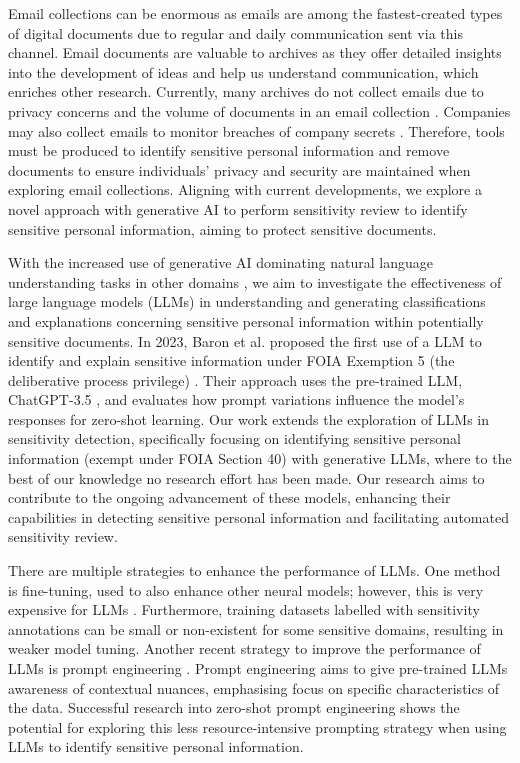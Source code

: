Email collections can be enormous as emails are among the fastest-created types of digital documents due to regular and daily communication sent via this channel. Email documents are valuable to archives as they offer detailed insights into the development of ideas and help us understand communication, which enriches other research. Currently, many archives do not collect emails due to privacy concerns and the volume of documents in an email collection \cite{TFTAEA:18}. Companies may also collect emails to monitor breaches of company secrets \cite{iqbal2021search}. Therefore, tools must be produced to identify sensitive personal information and remove documents to ensure individuals' privacy and security are maintained when exploring email collections. Aligning with current developments, we explore a novel approach with generative AI to perform sensitivity review to identify sensitive personal information, aiming to protect sensitive documents.

With the increased use of generative AI dominating natural language understanding tasks in other domains \cite{qiu2020pre, adiwardana2020towards, roller2020recipes, openai2023gpt}, we aim to investigate the effectiveness of large language models (LLMs) in understanding and generating classifications and explanations concerning sensitive personal information within potentially sensitive documents. In 2023, Baron et al. proposed the first use of a LLM to identify and explain sensitive information under FOIA Exemption 5 (the deliberative process privilege) \cite{baron2023using}. Their approach uses the pre-trained LLM, ChatGPT-3.5 \cite{brown2020language}, and evaluates how prompt variations influence the model's responses for zero-shot learning. Our work extends the exploration of LLMs in sensitivity detection, specifically focusing on identifying sensitive personal information (exempt under FOIA Section 40) with generative LLMs, where to the best of our knowledge no research effort has been made. Our research aims to contribute to the ongoing advancement of these models, enhancing their capabilities in detecting sensitive personal information and facilitating automated sensitivity review.

There are multiple strategies to enhance the performance of LLMs. One method is fine-tuning, used to also enhance other neural models; however, this is very expensive for LLMs \cite{naveed2023comprehensive}. Furthermore, training datasets labelled with sensitivity annotations can be small or non-existent for some sensitive domains, resulting in weaker model tuning. Another recent strategy to improve the performance of LLMs is prompt engineering \cite{liu2023pre}. Prompt engineering aims to give pre-trained LLMs awareness of contextual nuances, emphasising focus on specific characteristics of the data. Successful research into zero-shot prompt engineering \cite{wei2023zero, kojima2022large} shows the potential for exploring this less resource-intensive prompting strategy when using LLMs to identify sensitive personal information.

